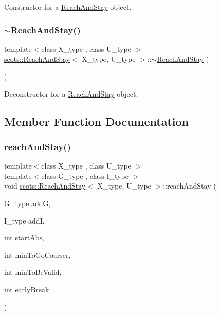 Constructor for a \hyperlink{classscots_1_1ReachAndStay}{Reach\+And\+Stay} object. \mbox{\label{classscots_1_1ReachAndStay_a03d6d40d05fc810d88965b3f7a78c2fe}} 
\subsubsection{\texorpdfstring{$\sim$\+Reach\+And\+Stay()}{~ReachAndStay()}}
{\footnotesize\ttfamily template$<$class X\+\_\+type , class U\+\_\+type $>$ \\
\hyperlink{classscots_1_1ReachAndStay}{scots\+::\+Reach\+And\+Stay}$<$ X\+\_\+type, U\+\_\+type $>$\+::$\sim$\hyperlink{classscots_1_1ReachAndStay}{Reach\+And\+Stay} (\begin{DoxyParamCaption}{ }\end{DoxyParamCaption})\hspace{0.3cm}{\ttfamily [inline]}}

Deconstructor for a \hyperlink{classscots_1_1ReachAndStay}{Reach\+And\+Stay} object. 

\subsection{Member Function Documentation}
\mbox{\label{classscots_1_1ReachAndStay_a8615d9a4050bbb186a38fe0e3ae97c69}} 
\subsubsection{\texorpdfstring{reach\+And\+Stay()}{reachAndStay()}}
{\footnotesize\ttfamily template$<$class X\+\_\+type , class U\+\_\+type $>$ \\
template$<$class G\+\_\+type , class I\+\_\+type $>$ \\
void \hyperlink{classscots_1_1ReachAndStay}{scots\+::\+Reach\+And\+Stay}$<$ X\+\_\+type, U\+\_\+type $>$\+::reach\+And\+Stay (\begin{DoxyParamCaption}\item[{G\+\_\+type}]{addG,  }\item[{I\+\_\+type}]{addI,  }\item[{int}]{start\+Abs,  }\item[{int}]{min\+To\+Go\+Coarser,  }\item[{int}]{min\+To\+Be\+Valid,  }\item[{int}]{early\+Break }\end{DoxyParamCaption})\hspace{0.3cm}{\ttfamily [inline]}}

